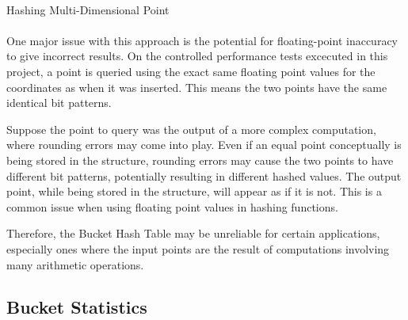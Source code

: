 \paragraph{}

\begin{algorithm}[H]
	\SetAlgoLined
	 

  	 {
	}

	\caption{Hashing Multi-Dimensional Point}
	\label{alg:point-hashing}
\end{algorithm}

\paragraph{}

One major issue with this approach is the potential for floating-point inaccuracy to give incorrect results. On the controlled performance tests excecuted in this project, a point is queried using the exact same floating point values for the coordinates as when it was inserted. This means the two points have the same identical bit patterns. 

Suppose the point to query was the output of a more complex computation, where rounding errors may come into play. Even if an equal point conceptually is being stored in the structure, rounding errors may cause the two points to have different bit patterns, potentially resulting in different hashed values. The output point, while being stored in the structure, will appear as if it is not. This is a common issue when using floating point values in hashing functions.

Therefore, the Bucket Hash Table may be unreliable for certain applications, especially ones where the input points are the result of computations involving many arithmetic operations.

\subsection{Bucket Statistics}

